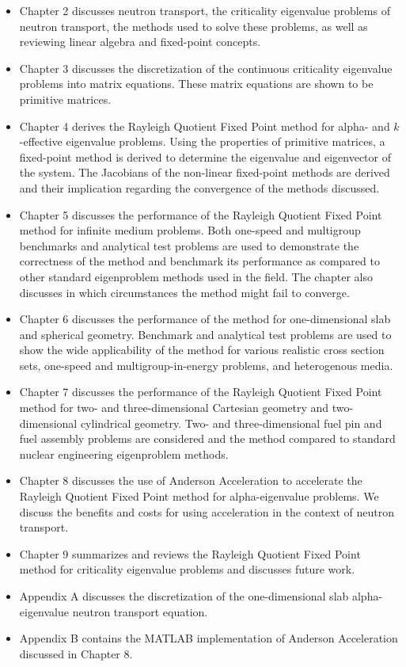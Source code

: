 \begin{itemize}
	\item Chapter 2 discusses neutron transport, the criticality eigenvalue problems of neutron transport, the methods used to solve these problems, as well as reviewing linear algebra and fixed-point concepts.
	\item Chapter 3 discusses the discretization of the continuous criticality eigenvalue problems into matrix equations. These matrix equations are shown to be primitive matrices.
	\item Chapter 4 derives the Rayleigh Quotient Fixed Point method for alpha- and $k$-effective eigenvalue problems. Using the properties of primitive matrices, a fixed-point method is derived to determine the eigenvalue and eigenvector of the system. The Jacobians of the non-linear fixed-point methods are derived and their implication regarding the convergence of the methods discussed.
	\item Chapter 5 discusses the performance of the Rayleigh Quotient Fixed Point method for infinite medium problems. Both one-speed and multigroup benchmarks and analytical test problems are used to demonstrate the correctness of the method and benchmark its performance as compared to other standard eigenproblem methods used in the field. The chapter also discusses in which circumstances the method might fail to converge.
	\item Chapter 6 discusses the performance of the method for one-dimensional slab and spherical geometry. Benchmark and analytical test problems are used to show the wide applicability of the method for various realistic cross section sets, one-speed and multigroup-in-energy problems, and heterogenous media.
	\item Chapter 7 discusses the performance of the Rayleigh Quotient Fixed Point method for two- and three-dimensional Cartesian geometry and two-dimensional cylindrical geometry. Two- and three-dimensional fuel pin and fuel assembly problems are considered and the method compared to standard nuclear engineering eigenproblem methods.
	\item Chapter 8 discusses the use of Anderson Acceleration to accelerate the Rayleigh Quotient Fixed Point method for alpha-eigenvalue problems. We discuss the benefits and costs for using acceleration in the context of neutron transport.
	\item Chapter 9 summarizes and reviews the Rayleigh Quotient Fixed Point method for criticality eigenvalue problems and discusses future work.
	\item Appendix A discusses the discretization of the one-dimensional slab alpha-eigenvalue neutron transport equation.
	\item Appendix B contains the MATLAB implementation of Anderson Acceleration discussed in Chapter 8.
\end{itemize}